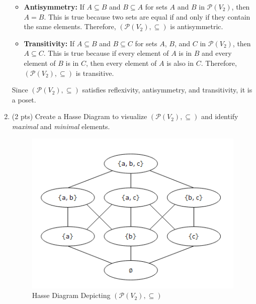 \documentclass[12pt]{article}
\begin{document}
\begin{spacing}{1.5}
\begin{enumerate}
\begin{itemize}
		      	\item \textbf{Antisymmetry:}
		      	      If \( A \subseteq B \) and \( B \subseteq A \) for sets \( A \) and \( B \) in \( \mathcal{P}(V_2) \), then \( A = B \). This is true because two sets are equal if and only if they contain the same elements. Therefore, \( (\mathcal{P}(V_2),\subseteq) \) is antisymmetric.
		      	                  
		      	\item \textbf{Transitivity:}
		      	      If \( A \subseteq B \) and \( B \subseteq C \) for sets \( A \), \( B \), and \( C \) in \( \mathcal{P}(V_2) \), then \( A \subseteq C \). This is true because if every element of \( A \) is in \( B \) and every element of \( B \) is in \( C \), then every element of \( A \) is also in \( C \). Therefore, \( (\mathcal{P}(V_2),\subseteq) \) is transitive.
		      \end{itemize}
		              
		      Since \( (\mathcal{P}(V_2),\subseteq) \) satisfies reflexivity, antisymmetry, and transitivity, it is a poset.
		              
		\item (2 pts) Create a Hasse Diagram to visualize $(\mathcal{P}(V_2),\subseteq)$ and identify \textit{maximal} and \textit{minimal} elements.
		      
		      \begin{figure}[htp]
		      	\centering
		      	\includegraphics{HasseDiagram_6_2_3.png}
		      	\caption{Hasse Diagram Depicting $(\mathcal{P}(V_2),\subseteq)$}
		      	\label{fig:figure}
		      \end{figure}
		        
	\end{enumerate}
		    

\end{spacing}
\end{document}
